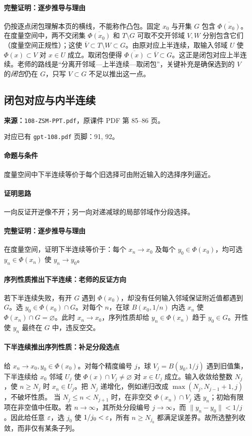 \paragraph{完整证明：逐步推导与理由}
仍按逐点闭包理解本页的横线，不能称作凸包。固定 $x_0$ 与开集 $G$ 包含 $\overline{\Phi(x_0)}$。在度量空间中，两不交闭集 $\overline{\Phi(x_0)}$ 和 $T\setminus G$ 可取不交开邻域 $V,W$ 分别包含它们（度量空间正规性）；这使 $\overline V\subset T\setminus W\subset G$。由原对应上半连续，取输入邻域 $U$ 使 $\Phi(x)\subset V$ 对 $x\in U$ 成立。取闭包便得 $\overline{\Phi(x)}\subset\overline V\subset G$。这正是闭包对应上半连续。老师的路线是“分离开邻域—上半连续—取闭包”，关键补充是确保选到的 $V$ 的\emph{闭包}仍在 $G$，只写 $V\subset G$ 不足以推出这一点。
\clearpage\subsection{闭包对应与内半连续}
\textbf{来源：}\texttt{108-ZSM-PPT.pdf}，原课件 PDF 第 85--86 页。\par
对应已有 \texttt{gpt-108.pdf} 页脚：91, 92。\par
\paragraph{命题与条件}度量空间中下半连续等价于每个旧选择可由附近输入的选择序列逼近。
\paragraph{证明思路}一向反证开逆像不开；另一向对递减球的局部邻域作分段选择。
\paragraph{完整证明：逐步推导与理由}

在度量空间，证明下半连续等价于：每个 $x_n\to x_0$ 及每个 $y_0\in\Phi(x_0)$，均可选 $y_n\in\Phi(x_n)$ 使 $y_n\to y_0$。
\paragraph{序列性质推出下半连续：老师的反证方向}
若下半连续失败，有开 $G$ 遇到 $\Phi(x_0)$，却没有任何输入邻域保证附近值都遇到 $G$。选 $y_0\in\Phi(x_0)\cap G$。对每个 $n$，在球 $B(x_0,1/n)$ 内选 $x_n$ 使 $\Phi(x_n)\cap G=\varnothing$。此时 $x_n\to x_0$，序列性质却给 $y_n\in\Phi(x_n)$ 趋于 $y_0\in G$。开性使 $y_n$ 最终在 $G$ 中，违反空交。
\paragraph{下半连续推出序列性质：补足分段选点}
给 $x_n\to x_0,y_0\in\Phi(x_0)$。对每个精度编号 $j$，球 $V_j=B(y_0,1/j)$ 遇到旧值集，下半连续给 $x_0$ 邻域 $U_j$ 使 $\Phi(x)\cap V_j\ne\varnothing$ 对 $x\in U_j$ 成立。输入收敛给整数 $N_j$，使 $n\ge N_j$ 时 $x_n\in U_j$。把 $N_j$ 递增化，例如递归改成 $\max(N_j,N_{j-1}+1,j)$，不破坏性质。
当 $N_j\le n<N_{j+1}$ 时，在非空交 $\Phi(x_n)\cap V_j$ 选 $y_n$；初始有限项在非空值中任取。若 $n\to\infty$，其所处分段编号 $j\to\infty$，而 $\|y_n-y_0\|<1/j$。因此给任意 $\varepsilon$，选 $j_0$ 使 $1/j_0<\varepsilon$，所有 $n\ge N_{j_0}$ 都满足误差界。故所选整列收敛，而非仅有某条子列。

